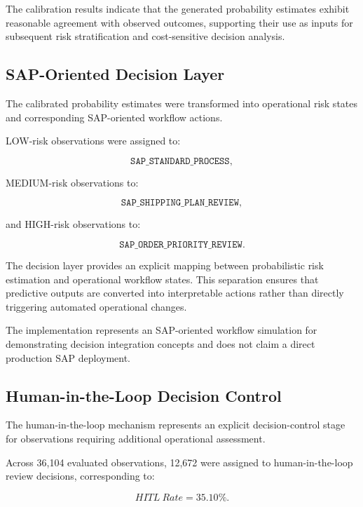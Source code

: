 \documentclass[11pt,a4paper]{article}
\begin{document}
The calibration results indicate that the generated probability estimates exhibit reasonable agreement with observed outcomes, supporting their use as inputs for subsequent risk stratification and cost-sensitive decision analysis.

\begin{table}[htbp]
\centering
\caption{Probability Calibration Results}
\label{tab:calibration}

\end{table}

\subsection{SAP-Oriented Decision Layer}

The calibrated probability estimates were transformed into operational risk states and corresponding SAP-oriented workflow actions.

LOW-risk observations were assigned to:

\[
\texttt{SAP\_STANDARD\_PROCESS},
\]

MEDIUM-risk observations to:

\[
\texttt{SAP\_SHIPPING\_PLAN\_REVIEW},
\]

and HIGH-risk observations to:

\[
\texttt{SAP\_ORDER\_PRIORITY\_REVIEW}.
\]

The decision layer provides an explicit mapping between probabilistic risk estimation and operational workflow states. This separation ensures that predictive outputs are converted into interpretable actions rather than directly triggering automated operational changes.

The implementation represents an SAP-oriented workflow simulation for demonstrating decision integration concepts and does not claim a direct production SAP deployment.

\subsection{Human-in-the-Loop Decision Control}

The human-in-the-loop mechanism represents an explicit decision-control stage for observations requiring additional operational assessment.

Across 36,104 evaluated observations, 12,672 were assigned to human-in-the-loop review decisions, corresponding to:

\[
HITL\ Rate = 35.10\%.
\]
\end{document}
